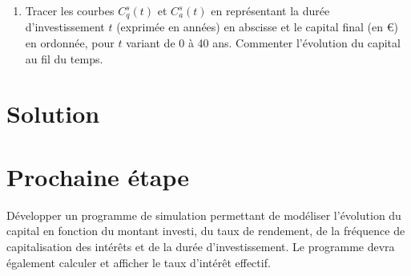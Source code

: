 \documentclass{article}
\begin{document}
\begin{enumerate}[label=\textbf{Q\arabic*.}]
    \item Tracer les courbes \( C^s_q(t) \) et \( C^s_a(t) \) en représentant la durée d'investissement \( t \) (exprimée en années) en abscisse et le capital final (en €) en ordonnée, pour \( t \) variant de 0 à 40 ans. Commenter l'évolution du capital au fil du temps.

\end{enumerate}

\section{Solution}


\section{Prochaine étape}  
Développer un programme de simulation permettant de modéliser l'évolution du capital en fonction du montant investi, du taux de rendement, de la fréquence de capitalisation des intérêts et de la durée d'investissement. Le programme devra également calculer et afficher le taux d'intérêt effectif.  
\end{document}
